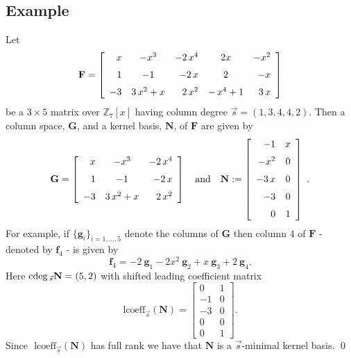 \subsection{Example}
\begin{example*}
\label{ex:example1} Let 
\[
\mathbf{F}=\left[\begin{array}{rcrcr}
x & -{x}^{3} & -2\,{x}^{4} & 2x & -{x}^{2}\\
\noalign{\medskip}1 & -1 & -2\, x & 2 & -x\\
\noalign{\medskip}-3 & 3\,{x}^{2}+x & 2\,{x}^{2} & -\,{x}^{4}+1 & 3\, x
\end{array}\right]
\]
 be a $3\times5$ matrix over $\mathbb{Z}_{7}[x]$ having column degree
$\vec{s}=(1,3,4,4,2)$. Then a column space, $\mathbf{G}$, and a
kernel basis, $\mathbf{N}$, of $\mathbf{F}$ are given by 
\[
\mathbf{G}=\left[\begin{array}{rcr}
x & -{x}^{3} & -2\,{x}^{4}\\
\noalign{\medskip}1 & -1 & -2\, x\\
\noalign{\medskip}-3 & 3\,{x}^{2}+x & 2\,{x}^{2}
\end{array}\right]~~\mbox{ and }~~\mathbf{N}:=\left[\begin{array}{rc}
-1 & x\\
\noalign{\medskip}-{x}^{2} & 0\\
\noalign{\medskip}-3\, x & 0\\
\noalign{\medskip}-3 & 0\\
\noalign{\medskip}0 & 1
\end{array}\right]~.
\]
 For example, if $\{\mathbf{g}_{i}\}_{i=1,...,5}$ denote the columns
of $\mathbf{G}$ then column $4$ of $\mathbf{F}$ - denoted by $\mathbf{f}_{4}$
- is given by 
\[
\mathbf{f}_{4}=-2~\mathbf{g}_{1}-2x^{2}~\mathbf{g}_{2}+x~\mathbf{g}_{3}+2~\mathbf{g}_{4}.
\]
 Here ${\rm cdeg}\,_{\vec{s}}\mathbf{N}=(5,2)$ with shifted leading coefficient
matrix 
\[
\mbox{lcoeff}_{\vec{s}}(\mathbf{N})=\left[\begin{array}{rc}
0 & 1\\
-1 & 0\\
-3 & 0\\
0 & 0\\
0 & 1
\end{array}\right].
\]
 Since $\mbox{ lcoeff}_{\vec{s}}(\mathbf{N})$ has full rank we have
that $\mathbf{N}$ is a $\vec{s}$-minimal kernel basis. \qed \end{example*}

